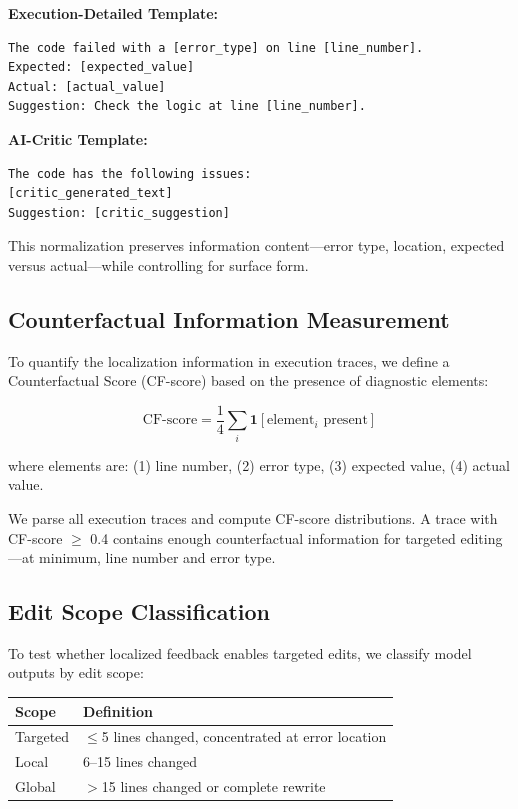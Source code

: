\textbf{Execution-Detailed Template:}
\begin{verbatim}
The code failed with a [error_type] on line [line_number].
Expected: [expected_value]
Actual: [actual_value]
Suggestion: Check the logic at line [line_number].
\end{verbatim}

\textbf{AI-Critic Template:}
\begin{verbatim}
The code has the following issues:
[critic_generated_text]
Suggestion: [critic_suggestion]
\end{verbatim}

This normalization preserves information content---error type, location, expected versus actual---while controlling for surface form.

\subsection{Counterfactual Information Measurement}

To quantify the localization information in execution traces, we define a Counterfactual Score (CF-score) based on the presence of diagnostic elements:

\begin{equation}
\text{CF-score} = \frac{1}{4}\sum_{i} \mathbf{1}[\text{element}_i \text{ present}]
\end{equation}

where elements are: (1) line number, (2) error type, (3) expected value, (4) actual value.

We parse all execution traces and compute CF-score distributions. A trace with CF-score $\geq$ 0.4 contains enough counterfactual information for targeted editing---at minimum, line number and error type.

\subsection{Edit Scope Classification}

To test whether localized feedback enables targeted edits, we classify model outputs by edit scope:

\begin{table}[h]
\centering
\begin{tabular}{@{}ll@{}}
\toprule
\textbf{Scope} & \textbf{Definition} \\
\midrule
Targeted & $\leq$5 lines changed, concentrated at error location \\
Local & 6--15 lines changed \\
Global & $>$15 lines changed or complete rewrite \\
\bottomrule
\end{tabular}
\end{table}

